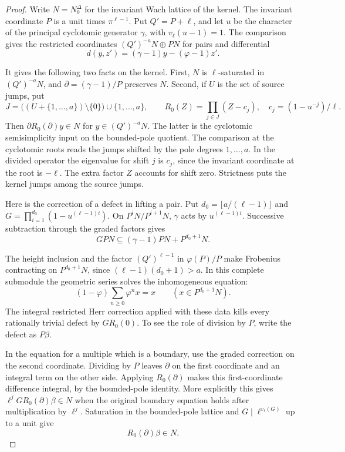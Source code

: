 \begin{proof}
Write \(N=N_0^\Delta\) for the invariant Wach lattice of the
kernel. The invariant coordinate \(P\) is a unit times
\(\pi^{\ell-1}\). Put \(Q'=P+\ell\), and let \(u\) be the
character of the principal cyclotomic generator \(\gamma\), with
\(v_\ell(u-1)=1\). The comparison gives the restricted coordinates
\((Q')^{-a}N\oplus PN\) for pairs and differential
\[
 d(y,z')=(\gamma-1)y-(\varphi-1)z'.
\]

It gives the following two facts on the kernel. First,
\(N\) is \(\ell\)-saturated in \((Q')^{-a}N\), and
\(\partial=(\gamma-1)/P\) preserves \(N\).
Second, if \(U\) is the set of source jumps, put
\[
 J=\big((U+\{1,\ldots,a\})\setminus\{0\}\big)
                \cup\{1,\ldots,a\},\qquad
 R_0(Z)=\prod_{j\in J}(Z-c_j),\quad c_j=(1-u^{-j})/\ell .
\]
Then \(\partial R_0(\partial)y\in N\) for \(y\in(Q')^{-a}N\).
The latter is the cyclotomic semisimplicity input on the
bounded-pole quotient. The comparison at the cyclotomic roots
reads the jumps shifted by the pole degrees \(1,\ldots,a\).
In the divided operator the eigenvalue for shift \(j\) is
\(c_j\), since the invariant coordinate at the root is
\(-\ell\). The extra factor \(Z\) accounts for shift zero.
Strictness puts the kernel jumps among the source jumps.
\label{cor:unramified-split-length-2}

Here is the correction of a defect in lifting a pair. Put
\(d_0=\lfloor a/(\ell-1)\rfloor\) and
\(G=\prod_{i=1}^{d_0}(1-u^{(\ell-1)i})\). On
\(P^iN/P^{i+1}N\), \(\gamma\) acts by \(u^{(\ell-1)i}\).
Successive subtraction through the graded factors gives
\[
 GPN\subseteq(\gamma-1)PN+P^{d_0+1}N.
\]

The height inclusion and the factor \((Q')^{\ell-1}\) in
\(\varphi(P)/P\) make Frobenius contracting on
\(P^{d_0+1}N\), since \((\ell-1)(d_0+1)>a\).
In this complete submodule the geometric series solves the inhomogeneous equation:
\[
 (1-\varphi)\sum_{n\ge0}\varphi^n x=x\qquad(x\in P^{d_0+1}N).
\] The integral restricted Herr
correction applied with these data kills every rationally
trivial defect by \(G R_0(0)\). To see the role of division
by \(P\), write the defect as \(P\beta\).

In the equation
for a multiple which is a boundary, use the graded correction
on the second coordinate. Dividing by \(P\) leaves
\(\partial\) on the first coordinate and an integral term
on the other side. Applying \(R_0(\partial)\) makes this
first-coordinate difference integral, by the bounded-pole
identity. More explicitly this gives \(\ell^j G R_0(\partial)\beta\in N\)
when the original boundary equation holds after multiplication by \(\ell^j\). Saturation in the
bounded-pole lattice and \(G\mid\ell^{v_\ell(G)}\) up to a unit
give
\[
 R_0(\partial)\beta\in N.
\]


\end{proof}
